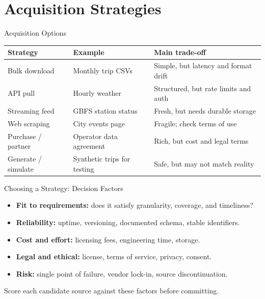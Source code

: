 \documentclass[aspectratio=43,11pt]{beamer}
\begin{document}
\section{Acquisition Strategies}

\begin{frame}{Acquisition Options}
  \footnotesize
  \begin{tabular}{@{}p{2.4cm}p{3.3cm}p{4.0cm}@{}}
    \toprule
    \textbf{Strategy} & \textbf{Example} & \textbf{Main trade-off} \\
    \midrule
    Bulk download & Monthly trip CSVs & Simple, but latency and format drift \\[3pt]
    API pull & Hourly weather & Structured, but rate limits and auth \\[3pt]
    Streaming feed & GBFS station status & Fresh, but needs durable storage \\[3pt]
    Web scraping & City events page & Fragile; check terms of use \\[3pt]
    Purchase / partner & Operator data agreement & Rich, but cost and legal terms \\[3pt]
    Generate / simulate & Synthetic trips for testing & Safe, but may not match reality \\
    \bottomrule
  \end{tabular}
\end{frame}

\begin{frame}{Choosing a Strategy: Decision Factors}
  \begin{itemize}
    \item \textbf{Fit to requirements:} does it satisfy granularity, coverage, and timeliness?
    \item \textbf{Reliability:} uptime, versioning, documented schema, stable identifiers.
    \item \textbf{Cost and effort:} licensing fees, engineering time, storage.
    \item \textbf{Legal and ethical:} license, terms of service, privacy, consent.
    \item \textbf{Risk:} single point of failure, vendor lock-in, source discontinuation.
  \end{itemize}

  \medskip
  Score each candidate source against these factors before committing.
\end{frame}
\end{document}
